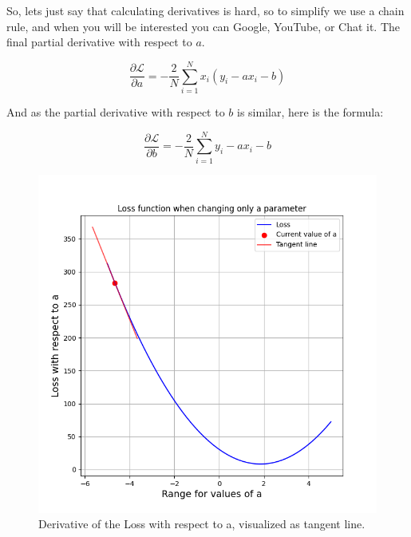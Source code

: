 \documentclass{article}
\begin{document}
So, lets just say that calculating derivatives is hard, so to simplify we use a chain rule, and when you will be interested you can Google, YouTube, or Chat it. The final partial derivative with respect to $a$.

\begin{equation}
    \frac{\partial\mathcal L}{\partial a} = -\frac{2}{N}\sum_{i=1}^{N}x_i \left(y_i-ax_i-b\right)
\end{equation}

And as the partial derivative with respect to $b$ is similar, here is the formula:

\begin{equation}
    \frac{\partial\mathcal L}{\partial b} = -\frac{2}{N}\sum_{i=1}^{N} y_i - ax_i-b
\end{equation}

\begin{figure}[h]
    \centering
    \begin{minipage}{0.4\textwidth}
        \centering
        \includegraphics[width=\linewidth]{../images/myplot9.png}
        \caption{Derivative of the Loss with respect to a, visualized as tangent line.}
    \end{minipage}
    \hfill
    \begin{minipage}{0.4\textwidth}
        \centering

\end{minipage}
\end{figure}
\end{document}
